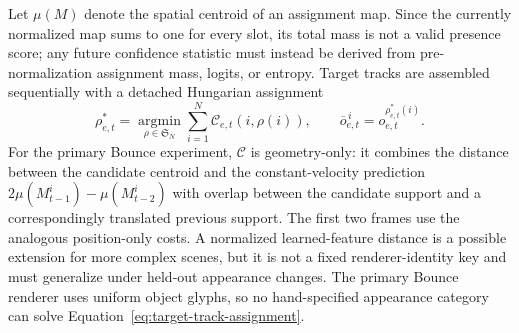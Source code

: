 Let $\mu(M)$ denote the spatial centroid of an assignment map.  Since the currently normalized
map sums to one for every slot, its total mass is not a valid presence score; any future
confidence statistic must instead be derived from pre-normalization assignment mass, logits, or
entropy.  Target tracks are assembled sequentially with a detached Hungarian assignment
\begin{equation}
    \rho_{e,t}^*
      =\underset{\rho\in\mathfrak S_N}{\operatorname{argmin}}
        \sum_{i=1}^{N}\mathcal{C}_{e,t}(i,\rho(i)),
    \qquad
    \overline o_{e,t}^{\,i}=o_{e,t}^{\rho_{e,t}^*(i)}.
    \label{eq:target-track-assignment}
\end{equation}
For the primary Bounce experiment, $\mathcal C$ is geometry-only: it combines the distance
between the candidate centroid and the constant-velocity prediction
$2\mu(M_{t-1}^i)-\mu(M_{t-2}^i)$ with overlap between the candidate support and a correspondingly
translated previous support.  The first two frames use the analogous position-only costs.  A
normalized learned-feature distance is a possible extension for more complex scenes, but it is
not a fixed renderer-identity key and must generalize under held-out appearance changes.  The
primary Bounce renderer uses uniform object glyphs, so no hand-specified appearance category can
solve Equation~\eqref{eq:target-track-assignment}.

